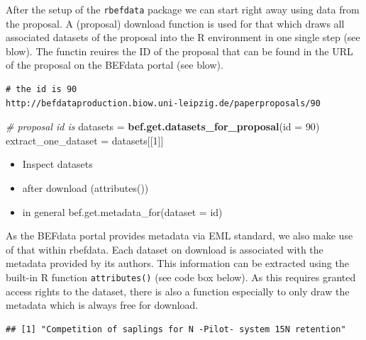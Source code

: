 \documentclass[]{article}
\newenvironment{Shaded}{}{}
\newcommand{\KeywordTok}[1]{\textcolor[rgb]{0.00,0.44,0.13}{\textbf{{#1}}}}
\newcommand{\DataTypeTok}[1]{\textcolor[rgb]{0.56,0.13,0.00}{{#1}}}
\newcommand{\DecValTok}[1]{\textcolor[rgb]{0.25,0.63,0.44}{{#1}}}
\newcommand{\CommentTok}[1]{\textcolor[rgb]{0.38,0.63,0.69}{\textit{{#1}}}}
\newcommand{\NormalTok}[1]{{#1}}
\begin{document}
After the setup of the \texttt{rbefdata} package we can start right away
using data from the proposal. A (proposal) download function is used for
that which draws all associated datasets of the proposal into the R
environment in one single step (see blow). The functin reuires the ID of
the proposal that can be found in the URL of the proposal on the BEFdata
portal (see blow).

\begin{verbatim}
# the id is 90
http://befdataproduction.biow.uni-leipzig.de/paperproposals/90
\end{verbatim}

\begin{Shaded}
\begin{Highlighting}[]
\CommentTok{# proposal id is}
\NormalTok{datasets = }\KeywordTok{bef.get.datasets_for_proposal}\NormalTok{(}\DataTypeTok{id =} \DecValTok{90}\NormalTok{)}
\NormalTok{extract_one_dataset = datasets[[}\DecValTok{1}\NormalTok{]]}
\end{Highlighting}
\end{Shaded}

\begin{itemize}
\itemsep1pt\parskip0pt
\item
  Inspect datasets
\item
  after download (attributes())
\item
  in general bef.get.metadata\_for(dataset = id)
\end{itemize}

As the BEFdata portal provides metadata via EML standard, we also make
use of that within rbefdata. Each dataset on download is associated with
the metadata provided by its authors. This information can be extracted
using the built-in R function \texttt{attributes()} (see code box
below). As this requires granted access rights to the dataset, there is
also a function especially to only draw the metadata which is always
free for download.

\begin{Shaded}
\end{Shaded}

\begin{verbatim}
## [1] "Competition of saplings for N -Pilot- system 15N retention"
\end{verbatim}
\end{document}
